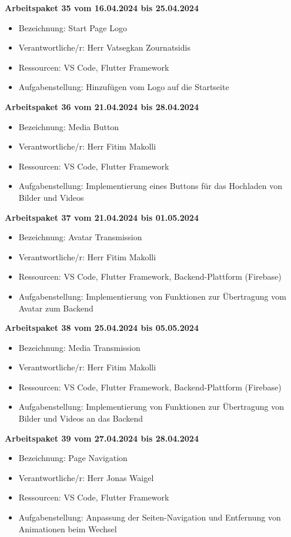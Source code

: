 \textbf{Arbeitspaket 35 vom 16.04.2024 bis 25.04.2024}
\begin{itemize}[itemsep=0pt]
    \item{Bezeichnung: Start Page Logo} 
	\item{Verantwortliche/r: Herr Vatsegkan Zournatsidis} 
	\item{Ressourcen: VS Code, Flutter Framework} 
    \item{Aufgabenstellung: Hinzufügen vom Logo auf die Startseite}
\end{itemize}

\textbf{Arbeitspaket 36 vom 21.04.2024 bis 28.04.2024}
\begin{itemize}[itemsep=0pt]
    \item{Bezeichnung: Media Button} 
	\item{Verantwortliche/r: Herr Fitim Makolli} 
	\item{Ressourcen: VS Code, Flutter Framework} 
    \item{Aufgabenstellung: Implementierung eines Buttons für das Hochladen von Bilder und Videos}
\end{itemize}

\textbf{Arbeitspaket 37 vom 21.04.2024 bis 01.05.2024}
\begin{itemize}[itemsep=0pt]
    \item{Bezeichnung: Avatar Transmission} 
	\item{Verantwortliche/r: Herr Fitim Makolli} 
	\item{Ressourcen: VS Code, Flutter Framework, Backend-Plattform (Firebase)}
    \item{Aufgabenstellung: Implementierung von Funktionen zur Übertragung vom Avatar zum Backend} 
\end{itemize} 

\textbf{Arbeitspaket 38 vom 25.04.2024 bis 05.05.2024}
\begin{itemize}[itemsep=0pt]
    \item{Bezeichnung: Media Transmission} 
	\item{Verantwortliche/r: Herr Fitim Makolli} 
	\item{Ressourcen: VS Code, Flutter Framework, Backend-Plattform (Firebase)}
    \item{Aufgabenstellung: Implementierung von Funktionen zur Übertragung von Bilder und Videos an das Backend} 
\end{itemize}


\textbf{Arbeitspaket 39 vom 27.04.2024 bis 28.04.2024}
\begin{itemize}[itemsep=0pt]
    \item{Bezeichnung: Page Navigation} 
	\item{Verantwortliche/r: Herr Jonas Waigel} 
	\item{Ressourcen: VS Code, Flutter Framework} 
    \item{Aufgabenstellung: Anpassung der Seiten-Navigation und Entfernung von Animationen beim Wechsel}
\end{itemize}

